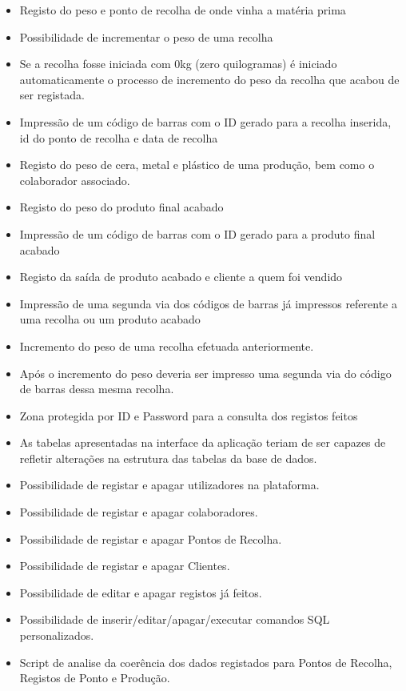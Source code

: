 \begin{itemize}
	\item Registo do peso e ponto de recolha de onde vinha a matéria prima
	\item Possibilidade de incrementar o peso de uma recolha
	\item Se a recolha fosse iniciada com 0kg (zero quilogramas) é iniciado automaticamente o processo de incremento do peso da recolha que acabou de ser registada.
	\item Impressão de um código de barras com o ID gerado para a recolha inserida, id do ponto de recolha e data de recolha
	\item Registo do peso de cera, metal e plástico de uma produção, bem como o colaborador associado.
	\item Registo do peso do produto final acabado
	\item Impressão de um código de barras com o ID gerado para a produto final acabado
	\item Registo da saída de produto acabado e cliente a quem foi vendido
	\item Impressão de uma segunda via dos códigos de barras já impressos referente a uma recolha ou um produto acabado
	\item Incremento do peso de uma recolha efetuada anteriormente.
	\item Após o incremento do peso deveria ser impresso uma segunda via do código de barras dessa mesma recolha.
	\item Zona protegida por ID e Password para a consulta dos registos feitos
	\item As tabelas apresentadas na interface da aplicação teriam de ser capazes de refletir alterações na estrutura das tabelas da base de dados.
	\item Possibilidade de registar e apagar utilizadores na plataforma.
	\item Possibilidade de registar e apagar colaboradores.
	\item Possibilidade de registar e apagar Pontos de Recolha.
	\item Possibilidade de registar e apagar Clientes.
	\item Possibilidade de editar e apagar registos já feitos.
	\item Possibilidade de inserir/editar/apagar/executar comandos SQL personalizados.
	\item Script de analise da coerência dos dados registados para Pontos de Recolha, Registos de Ponto e Produção.
\end{itemize}